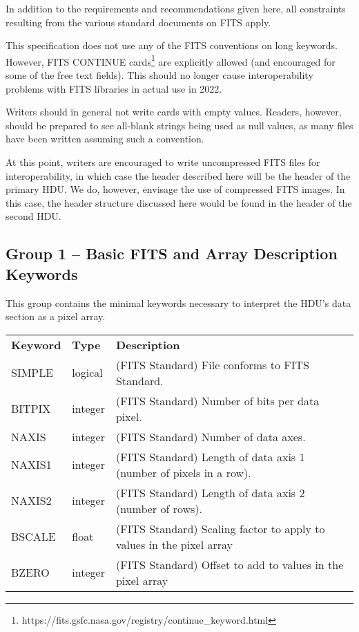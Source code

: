 \documentclass[11pt]{ivoa}
\begin{document}
In addition to the requirements and recommendations given here, all
constraints resulting from the various standard documents on FITS apply.

This specification does not use any of the FITS conventions on long
keywords.  However, FITS CONTINUE
cards\footnote{https://fits.gsfc.nasa.gov/registry/continue_keyword.html} 
are explicitly
allowed (and encouraged for some of the free text fields).  This should
no longer cause interoperability problems with FITS libraries in actual
use in 2022.

Writers should in general not write cards with empty values.  Readers,
however, should be prepared to see all-blank strings being used as null
values, as many files have been written assuming such a convention.

At this point, writers are encouraged to write uncompressed FITS files
for interoperability, in which case the header described here will be
the header of the primary HDU.  We do, however, envisage the use of
compressed FITS images.  In this case, the header structure discussed
here would be found in the header of the second HDU.


\subsection{Group 1 -- Basic FITS and Array Description Keywords}

This group contains the minimal keywords necessary to interpret the
HDU's data section as a pixel array.

\begin{inlinetable}
\footnotesize
\begin{tabular}{llp{}}
\sptablerule
\textbf{Keyword}&\textbf{Type}&\textbf{Description}\\
\sptablerule
SIMPLE     &logical     &(FITS Standard) File conforms to FITS Standard.\\
BITPIX     &integer     &(FITS Standard) Number of bits per data pixel.\\
NAXIS      &integer     &(FITS Standard) Number of data axes.\\
NAXIS1     &integer     &(FITS Standard) Length of data axis 1
(number of pixels in a row).\\
NAXIS2     &integer     &(FITS Standard) Length of data axis 2
(number of rows).\\
BSCALE     &float             &(FITS Standard) Scaling factor to apply
to values in the pixel array\\
BZERO      &integer     &(FITS Standard) Offset to add to values in the
pixel array\\
\end{tabular}
\end{inlinetable}
\end{document}
